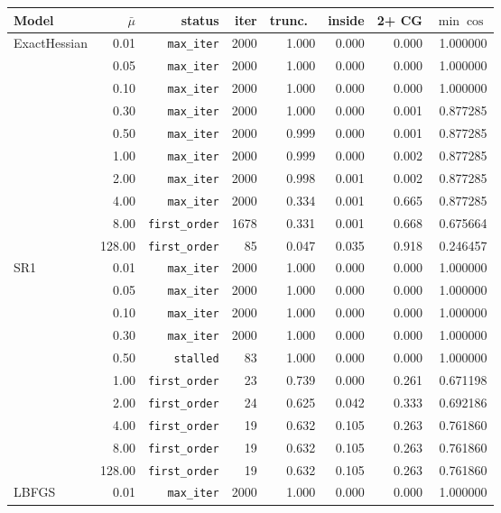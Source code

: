 \begin{tabular}{@{}lrrrrrrr@{}}
\toprule
Model & $\bar{\mu}$ & status & iter & trunc.\ & inside & 2+ CG & $\min\cos$ \\ 
\midrule
ExactHessian & 0.01 & \texttt{max\_iter} & 2000 & 1.000 & 0.000 & 0.000 & 1.000000 \\ 
 & 0.05 & \texttt{max\_iter} & 2000 & 1.000 & 0.000 & 0.000 & 1.000000 \\ 
 & 0.10 & \texttt{max\_iter} & 2000 & 1.000 & 0.000 & 0.000 & 1.000000 \\ 
 & 0.30 & \texttt{max\_iter} & 2000 & 1.000 & 0.000 & 0.001 & 0.877285 \\ 
 & 0.50 & \texttt{max\_iter} & 2000 & 0.999 & 0.000 & 0.001 & 0.877285 \\ 
 & 1.00 & \texttt{max\_iter} & 2000 & 0.999 & 0.000 & 0.002 & 0.877285 \\ 
 & 2.00 & \texttt{max\_iter} & 2000 & 0.998 & 0.001 & 0.002 & 0.877285 \\ 
 & 4.00 & \texttt{max\_iter} & 2000 & 0.334 & 0.001 & 0.665 & 0.877285 \\ 
 & 8.00 & \texttt{first\_order} & 1678 & 0.331 & 0.001 & 0.668 & 0.675664 \\ 
 & 128.00 & \texttt{first\_order} & 85 & 0.047 & 0.035 & 0.918 & 0.246457 \\ 
\midrule
SR1 & 0.01 & \texttt{max\_iter} & 2000 & 1.000 & 0.000 & 0.000 & 1.000000 \\ 
 & 0.05 & \texttt{max\_iter} & 2000 & 1.000 & 0.000 & 0.000 & 1.000000 \\ 
 & 0.10 & \texttt{max\_iter} & 2000 & 1.000 & 0.000 & 0.000 & 1.000000 \\ 
 & 0.30 & \texttt{max\_iter} & 2000 & 1.000 & 0.000 & 0.000 & 1.000000 \\ 
 & 0.50 & \texttt{stalled} & 83 & 1.000 & 0.000 & 0.000 & 1.000000 \\ 
 & 1.00 & \texttt{first\_order} & 23 & 0.739 & 0.000 & 0.261 & 0.671198 \\ 
 & 2.00 & \texttt{first\_order} & 24 & 0.625 & 0.042 & 0.333 & 0.692186 \\ 
 & 4.00 & \texttt{first\_order} & 19 & 0.632 & 0.105 & 0.263 & 0.761860 \\ 
 & 8.00 & \texttt{first\_order} & 19 & 0.632 & 0.105 & 0.263 & 0.761860 \\ 
 & 128.00 & \texttt{first\_order} & 19 & 0.632 & 0.105 & 0.263 & 0.761860 \\ 
\midrule
LBFGS & 0.01 & \texttt{max\_iter} & 2000 & 1.000 & 0.000 & 0.000 & 1.000000 \\ 

\end{tabular}
